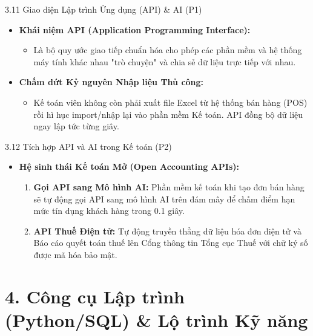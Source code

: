\documentclass[aspectratio=169]{beamer}
\begin{document}
\begin{frame}{3.11 Giao diện Lập trình Ứng dụng (API) \& AI (P1)}
    \begin{itemize}
        \item \textbf{Khái niệm API (Application Programming Interface):}
        \begin{itemize}
            \item Là bộ quy ước giao tiếp chuẩn hóa cho phép các phần mềm và hệ thống máy tính khác nhau "trò chuyện" và chia sẻ dữ liệu trực tiếp với nhau.
        \end{itemize}
        \item \textbf{Chấm dứt Kỷ nguyên Nhập liệu Thủ công:}
        \begin{itemize}
            \item Kế toán viên không còn phải xuất file Excel từ hệ thống bán hàng (POS) rồi hì hục import/nhập lại vào phần mềm Kế toán. API đồng bộ dữ liệu ngay lập tức từng giây.
        \end{itemize}
    \end{itemize}
\end{frame}

\begin{frame}{3.12 Tích hợp API và AI trong Kế toán (P2)}
    \begin{itemize}
        \item \textbf{Hệ sinh thái Kế toán Mở (Open Accounting APIs):}
        \begin{enumerate}
            \item \textbf{Gọi API sang Mô hình AI:} Phần mềm kế toán khi tạo đơn bán hàng sẽ tự động gọi API sang mô hình AI trên đám mây để chấm điểm hạn mức tín dụng khách hàng trong 0.1 giây.
            \item \textbf{API Thuế Điện tử:} Tự động truyền thẳng dữ liệu hóa đơn điện tử và Báo cáo quyết toán thuế lên Cổng thông tin Tổng cục Thuế với chữ ký số được mã hóa bảo mật.
        \end{enumerate}
    \end{itemize}
\end{frame}

\section{4. Công cụ Lập trình (Python/SQL) \& Lộ trình Kỹ năng}
\end{document}

